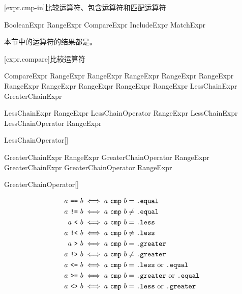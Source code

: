 [expr.cmp-in]{比较运算符、包含运算符和匹配运算符}

\begin{bnf}{BooleanExpr}
    RangeExpr \br
    CompareExpr \br
    IncludeExpr \br
    MatchExpr
\end{bnf}

\pnum
本节中的运算符的结果都是。

[expr.compare]{比较运算符}

\begin{bnf}{CompareExpr}
    RangeExpr \terminal{!=} RangeExpr \br
    RangeExpr \terminal{!<} RangeExpr \br
    RangeExpr \terminal{!>} RangeExpr \br
    RangeExpr \terminal{<>} RangeExpr \br
    RangeExpr  RangeExpr \br
    LessChainExpr \br
    GreaterChainExpr
\end{bnf}

\begin{bnf}{LessChainExpr}
    RangeExpr LessChainOperator RangeExpr \br
    LessChainExpr LessChainOperator RangeExpr
\end{bnf}

\begin{bnf}{LessChainOperator}[\oneof]
    \terminal{< == <=}
\end{bnf}

\begin{bnf}{GreaterChainExpr}
    RangeExpr GreaterChainOperator RangeExpr \br
    GreaterChainExpr GreaterChainOperator RangeExpr
\end{bnf}

\begin{bnf}{GreaterChainOperator}[\oneof]
    \terminal{> == >=}
\end{bnf}

\begin{align*}
a\ \tcode{==}\ b &\iff a\ \tcode{cmp}\ b = \tcode{.equal} \\
a\ \tcode{!=}\ b &\iff a\ \tcode{cmp}\ b \ne \tcode{.equal} \\
a\ \tcode{<}\ b &\iff a\ \tcode{cmp}\ b = \tcode{.less} \\
a\ \tcode{!<}\ b &\iff a\ \tcode{cmp}\ b \ne \tcode{.less} \\
a\ \tcode{>}\ b &\iff a\ \tcode{cmp}\ b = \tcode{.greater} \\
a\ \tcode{!>}\ b &\iff a\ \tcode{cmp}\ b \ne \tcode{.greater} \\
a\ \tcode{<=}\ b &\iff a\ \tcode{cmp}\ b = \tcode{.less}\ \mathrm{or} \ \tcode{.equal} \\
a\ \tcode{>=}\ b &\iff a\ \tcode{cmp}\ b = \tcode{.greater}\ \mathrm{or} \ \tcode{.equal} \\
a\ \tcode{<>}\ b &\iff a\ \tcode{cmp}\ b = \tcode{.less}\ \mathrm{or} \ \tcode{.greater}
\end{align*}

